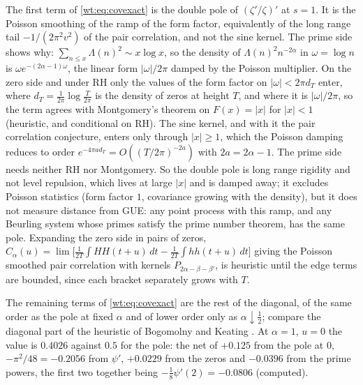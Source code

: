The first term of \eqref{wt:eq:covexact} is the double pole of $(\zeta'/\zeta)'$ at $s=1$. It is the Poisson smoothing of the ramp of the form factor, equivalently of the long range tail $-1/(2\pi^2v^2)$ of the pair correlation, and not the sine kernel. The prime side shows why: $\sum_{n\le x}\Lambda(n)^2\sim x\log x$, so the density of $\Lambda(n)^2n^{-2\alpha}$ in $\omega=\log n$ is $\omega e^{-(2\alpha-1)\omega}$, the linear form $|\omega|/2\pi$ damped by the Poisson multiplier. On the zero side and under RH only the values of the form factor on $|\omega|<2\pi d_T$ enter, where $d_T=\frac1{2\pi}\log\frac T{2\pi}$ is the density of zeros at height $T$, and where it is $|\omega|/2\pi$, so the term agrees with Montgomery's theorem \cite{Montgomery73} on $F(x)=|x|$ for $|x|<1$ (heuristic, and conditional on RH). The sine kernel, and with it the pair correlation conjecture, enters only through $|x|\ge1$, which the Poisson damping reduces to order $e^{-4\pi ad_T}=O((T/2\pi)^{-2a})$ with $2a=2\alpha-1$. The prime side needs neither RH nor Montgomery. So the double pole is long range rigidity and not level repulsion, which lives at large $|x|$ and is damped away; it excludes Poisson statistics (form factor $1$, covariance growing with the density), but it does not measure distance from GUE: any point process with this ramp, and any Beurling system whose primes satisfy the prime number theorem, has the same pole. Expanding the zero side in pairs of zeros, $C_\alpha(u)=\lim\bigl[\frac1{2T}\int HH(t+u)\,dt-\frac1{2T}\int hh(t+u)\,dt\bigr]$ giving the Poisson smoothed pair correlation with kernels $P_{2\alpha-\beta-\beta'}$, is heuristic until the edge terms are bounded, since each bracket separately grows with $T$.

The remaining terms of \eqref{wt:eq:covexact} are the rest of the diagonal, of the same order as the pole at fixed $\alpha$ and of lower order only as $\alpha\downarrow\frac12$; compare the diagonal part of the heuristic of Bogomolny and Keating \cite{BogomolnyKeating96}. At $\alpha=1$, $u=0$ the value is $0.4026$ against $0.5$ for the pole: the net of $+0.125$ from the pole at $0$, $-\pi^2/48=-0.2056$ from $\psi'$, $+0.0229$ from the zeros and $-0.0396$ from the prime powers, the first two together being $-\frac18\psi'(2)=-0.0806$ (computed).

